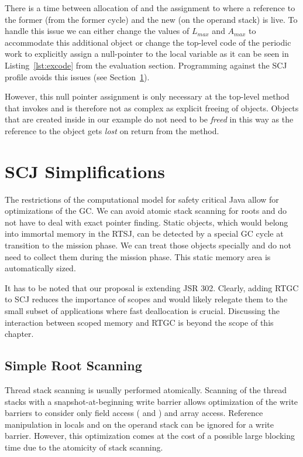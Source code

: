 There is a time between allocation of  and the assignment
to  where a reference to the former  (from the
former cycle) and the new  (on the operand stack) is live.
To handle this issue we can either change the values of $L_{max}$ and
$A_{max}$ to accommodate this additional object or change the
top-level code of the periodic work to explicitly assign a
null-pointer to the local variable  as it can be seen in
Listing~\ref{lst:excode} from the evaluation section. Programming
against the SCJ profile avoids this issues (see
Section~\ref{sec:scj:simple}).

However, this null pointer assignment is only necessary at the
top-level method that invokes  and is
therefore not as complex as explicit freeing of objects. Objects
that are created inside  in our example do not need to be
\emph{freed} in this way as the reference to the object gets
\emph{lost} on return from the method.

\section{SCJ Simplifications} \label{sec:scj:simple}

The restrictions of the computational model for safety critical Java
allow for optimizations of the GC. We can avoid atomic stack
scanning for roots and do not have to deal with exact pointer
finding. Static objects, which would belong into immortal memory in
the RTSJ, can be detected by a special GC cycle at transition to the
mission phase. We can treat those objects specially and do not need
to collect them during the mission phase. This static memory area is
automatically sized.

It has to be noted that our proposal is extending JSR 302. Clearly,
adding RTGC to SCJ reduces the importance of scopes and would likely
relegate them to the small subset of applications where fast
deallocation is crucial. Discussing the interaction between scoped
memory  and RTGC is beyond the scope of this chapter.

\subsection{Simple Root Scanning}

Thread stack scanning is usually performed atomically. Scanning of
the thread stacks with a snapshot-at-beginning write barrier
\cite{gc:yuasa90} allows optimization of the write barriers to
consider only field access ( and ) and
array access. Reference manipulation in locals and on the operand
stack can be ignored for a write barrier. However, this optimization
comes at the cost of a possible large blocking time due to the
atomicity of stack scanning.


